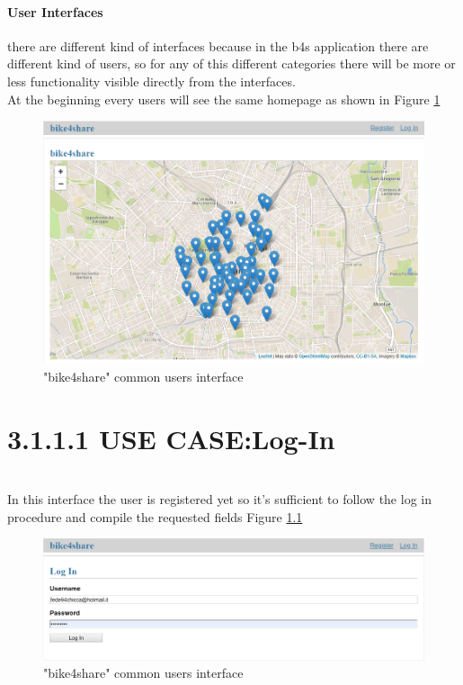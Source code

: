 \documentclass{article}
\begin{document}
\subsubsection{User Interfaces}
there are different kind of interfaces because in the b4s application there are different kind of users, so for any of this different categories there will be more or less functionality visible directly from the interfaces.\\
At the beginning every users will see the same homepage as shown in Figure \ref{fig:homepage}\\
\begin{figure}[H]
    \centering
    \includegraphics[width=0.75\linewidth]{image/bike4share_user_homepage.PNG}
    \caption{"bike4share" common users interface}
    \label{fig:homepage}
\end{figure}

\chapter{3.1.1.1 USE CASE:Log-In}\\

In this interface the user is registered yet so it's sufficient to follow the log in procedure and compile the requested fields Figure \ref{fig:log-in 2}
\begin{figure}[h]
    \centering
    \includegraphics[width=0.75\linewidth]{image/log-in_interface.PNG}
    \caption{"bike4share" common users interface}
    \label{fig:log-in 2}
\end{figure}
\end{document}
